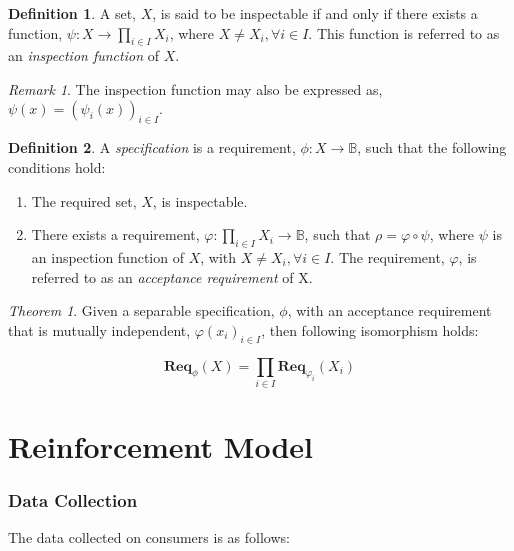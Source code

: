 \documentclass{article}
\theoremstyle{definition}
\newtheorem{definition}{Definition}[section]
\theoremstyle{remark}
\newtheorem*{remark}{Remark}
\newtheorem*{theorem}{Theorem}
\newcommand{\func}[3]{#1:#2\rightarrow#3}
\newcommand{\reqfunc}[2]{#1:#2\rightarrow\mathbb{B}}
\newcommand{\reqop}[2]{\mathbf{Req}_{#1}(#2)}
\begin{document}
	
		\begin{definition}
			A set, $X$, is said to be inspectable if and only if there exists a function,
			$\func{\psi}{X}{\prod_{i \in I}{X_{i}}}$, where $X \ne X_{i}, \forall i \in I$. This function is referred to as an
			\emph{inspection function} of $X$.
		\end{definition}
		
		\begin{remark}
			The inspection function may also be expressed as, $\psi(x) = (\psi_{i}(x))_{i \in I}.$
		\end{remark}
		
		\begin{definition}
			A \emph{specification} is a requirement, $\reqfunc{\phi}{X}$, such that the following conditions
			hold:
			
			\begin{enumerate}
				\item The required set, $X$, is inspectable.
				
				\item There exists a requirement, $\reqfunc{\varphi}{\prod_{i \in I}{X_{i}}}$,
				such that $\rho = \varphi \circ \psi$, where $\psi$ is an inspection function of $X$,
				with $X \ne X_{i}, \forall i \in I$. The requirement, $\varphi$, is referred to as an
				\emph{acceptance requirement} of X.
			\end{enumerate}
			
		\end{definition}
		
		\begin{theorem}
			Given a separable specification, $\phi$, with an acceptance requirement that is mutually independent,
			$\varphi(x_i)_{i \in I}$, then following isomorphism holds:
			
			\[
			\reqop{\phi}{X} = \prod_{i \in I}\reqop{\varphi_{i}}{X_{i}}
			\]
		\end{theorem}
	\fi
	
	\newpage
	
\part{Reinforcement Model}

	\section{Data Collection}

	The data collected on consumers is as follows:
	\begin{table}

	\end{table}
\end{document}
